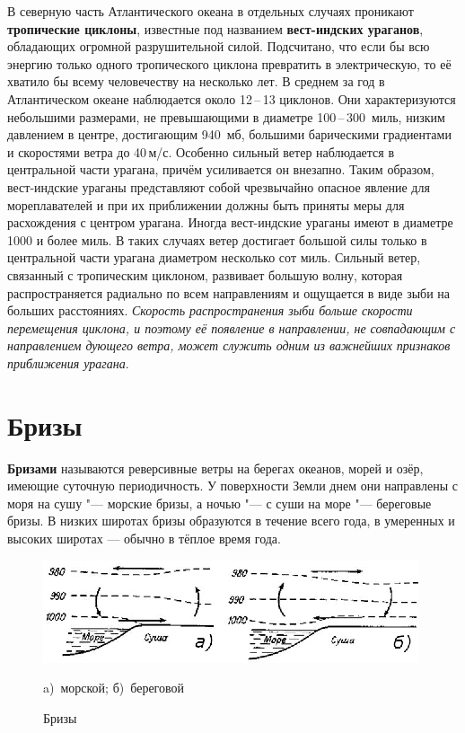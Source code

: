 \documentclass[a4paper, 12pt, twoside, final, book, russian, fittopage, cyremdash, openright]{ncc}
\newcommand{\mps}{\,м/с\xspace}
\newcommand{\otdo}{\,--\,}
\begin{document}
В северную часть Атлантического океана в отдельных случаях проникают
\textbf{тропические циклоны}, известные под
названием \textbf{вест-индских ураганов},
обладающих огромной разрушительной силой. Подсчитано, что если бы всю
энергию только одного тропического циклона превратить в электрическую,
то её хватило бы всему человечеству на несколько лет. В среднем за год
в Атлантическом океане наблюдается около 12\otdo13 циклонов. Они
характеризуются небольшими размерами, не превышающими в диаметре
100\otdo300~миль, низким давлением в центре, достигающим 940~мб,
большими барическими градиентами и скоростями ветра до
40\mps. Особенно сильный ветер наблюдается в центральной части
урагана, причём усиливается он внезапно. Таким образом, вест-индские
ураганы представляют собой чрезвычайно опасное явление для
мореплавателей и при их приближении должны быть приняты меры для
расхождения с центром урагана.  Иногда вест-индские ураганы имеют в
диаметре 1000 и более миль. В таких случаях ветер достигает большой
силы только в центральной части урагана диаметром несколько сот
миль. Сильный ветер, связанный с тропическим циклоном, развивает
большую волну, которая распространяется радиально по всем направлениям
и ощущается в виде зыби на больших расстояниях. \textit{Скорость
  распространения зыби больше скорости перемещения циклона, и поэтому
  её появление в направлении, не совпадающим с направлением дующего
  ветра, может служить одним из важнейших признаков приближения
  урагана}.

\section{Бризы}
\label{sec:breeze}

\textbf{Бризами} называются реверсивные ветры на берегах
океанов, морей и озёр, имеющие суточную периодичность. У поверхности
Земли днем они направлены с моря на сушу "--- морские бризы, а ночью
"--- с суши на море "--- береговые бризы. В низких широтах бризы
образуются в течение всего года, в умеренных и высоких широтах —
обычно в тёплое время года.

\begin{figure}[htb]
   \centering
   \includegraphics[scale=3]{01_breeze_a_b.eps}
   \caption{Бризы}
   \label{fig:01_breeze}
   \centering{}
   \small
   a)~морской; б)~береговой
\end{figure}
\end{document}
